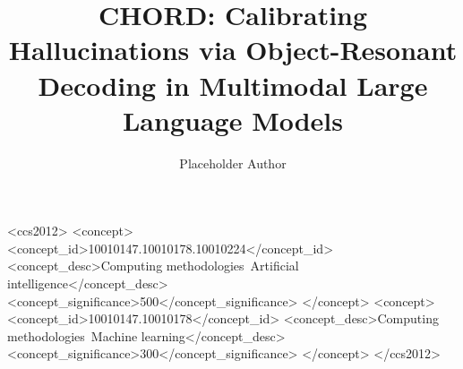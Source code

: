 \documentclass[sigconf, screen, review, anonymous]{acmart}
\begin{document}
\title[CHORD]{CHORD: Calibrating Hallucinations via Object-Resonant Decoding in Multimodal Large Language Models}

\author{Placeholder Author}

\begin{abstract}

\end{abstract}

\begin{CCSXML}
<ccs2012>
 <concept>
  <concept_id>10010147.10010178.10010224</concept_id>
  <concept_desc>Computing methodologies~Artificial intelligence</concept_desc>
  <concept_significance>500</concept_significance>
 </concept>
 <concept>
  <concept_id>10010147.10010178</concept_id>
  <concept_desc>Computing methodologies~Machine learning</concept_desc>
  <concept_significance>300</concept_significance>
 </concept>
</ccs2012>
\end{CCSXML}



\maketitle








\appendix




\end{document}
